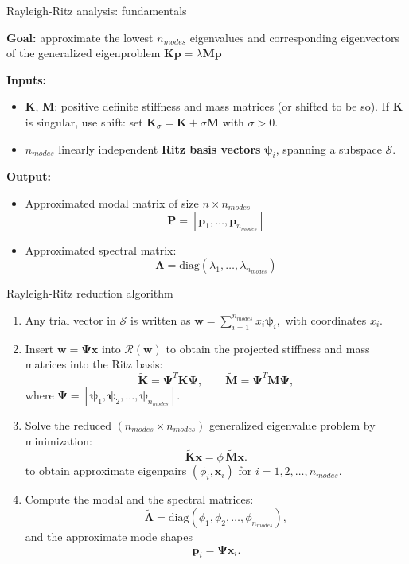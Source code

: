 \documentclass[aspectratio=169]{beamer}
\begin{document}
\begin{frame}{Rayleigh-Ritz analysis: fundamentals}
  \begin{block}{}
    \textbf{Goal:} approximate the lowest $n_{modes}$ eigenvalues and corresponding eigenvectors of the generalized eigenproblem \( \mathbf K\mathbf p = \lambda\mathbf M \mathbf p \)
  \end{block}

  \textbf{Inputs:}
  \begin{itemize}
    \item \(\mathbf K \), \(\mathbf M \): positive definite stiffness and mass matrices (or shifted to be so). If $\mathbf K$ is singular, use shift: set \( \mathbf K_\sigma =\mathbf K + \sigma\mathbf M \) with \( \sigma > 0 \).
    \item $n_{modes}$ linearly independent \textbf{Ritz basis vectors} $\boldsymbol{\psi}_i$, spanning a subspace $\mathcal S$.
  \end{itemize}

  \textbf{Output:}
  \begin{itemize}
    \item Approximated modal matrix of size $n\times n_{modes}$
          $$\mathbf P=[\mathbf p_1,\dots,\mathbf p_{n_{modes}}]$$
    \item Approximated spectral matrix: $$\mathbf \Lambda=\text{diag}(\lambda_1,\dots,\lambda_{n_{modes}})$$
  \end{itemize}
\end{frame}


\begin{frame}{Rayleigh-Ritz reduction algorithm}
  \begin{enumerate}
    \item Any trial vector in $\mathcal S$ is written as
          \(
          \mathbf w = \sum_{i=1}^{n_{modes}} x_i \boldsymbol{\psi}_i ,
          \)
          with coordinates $x_i$.
    \item Insert $\mathbf w = \mathbf \Psi \mathbf x$ into $\mathcal R(\mathbf w)$ to obtain the projected stiffness and mass matrices into the Ritz basis:
          \[
            \tilde{\mathbf K} = \mathbf \Psi^T \mathbf K \mathbf \Psi, \qquad \tilde{\mathbf M} = \mathbf \Psi^T \mathbf M \mathbf \Psi,
          \]
          where $\mathbf \Psi = [\boldsymbol{\psi}_1, \boldsymbol{\psi}_2, \dots, \boldsymbol{\psi}_{n_{modes}}]$.
    \item Solve the reduced $(n_{modes}\times n_{modes})$ generalized eigenvalue problem by minimization:
          \[
            \tilde{\mathbf K} \mathbf x = \phi\, \tilde{\mathbf M} \mathbf x .
          \]
          to obtain approximate eigenpairs $(\phi_i, \mathbf x_i)$   for \( i = 1, 2, \dots, n_{modes} \).
    \item Compute the modal and the spectral matrices:
          \[
            \tilde{\mathbf \Lambda} = \text{diag}(\phi_1, \phi_2, \dots, \phi_{n_{modes}}) ,
          \]
          and the approximate mode shapes
          \[
            \mathbf p_i = \mathbf \Psi \mathbf x_i .
          \]
  \end{enumerate}
\end{frame}
\end{document}
